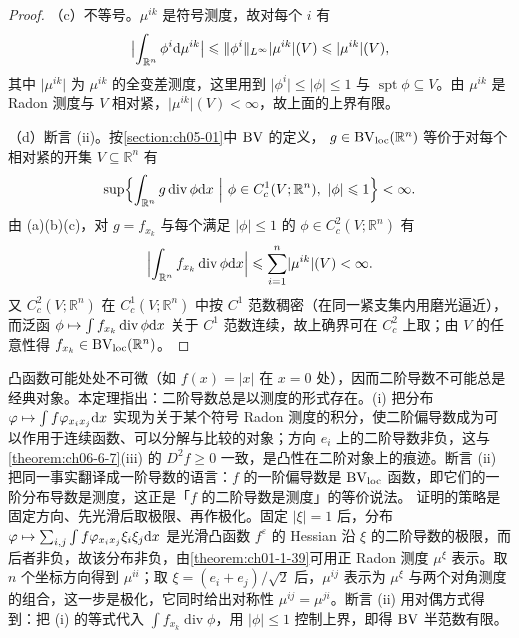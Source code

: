 \documentclass[../../main.tex]{subfiles}%
\begin{document}
\begin{proof}
（c）不等号。$\mu^{ik}$ 是符号测度，故对每个 $i$ 有
\begin{align*}
\bigl\lvert\int_{\mathbb{R}^n}\phi^{i}\mathrm{d}\mu^{ik}\bigr\rvert\leqslant\lVert\phi^{i}\rVert_{L^{\infty}}\lvert\mu^{ik}\rvert(V)\leqslant\lvert\mu^{ik}\rvert(V),
\end{align*}
其中 $\lvert\mu^{ik}\rvert$ 为 $\mu^{ik}$ 的全变差测度，这里用到 $\lvert\phi^{i}\rvert\leqslant\lvert\phi\rvert\leqslant1$ 与 $\operatorname{spt}\phi\subseteq V$。由 $\mu^{ik}$ 是 Radon 测度与 $V$ 相对紧，$\lvert\mu^{ik}\rvert(V)<\infty$，故上面的上界有限。

（d）断言 (ii)。按\cref{section:ch05-01}中 $\mathrm{BV}$ 的定义，%
$g\in\mathrm{BV}_{\mathrm{loc}}(\mathbb{R}^n)$ 等价于对每个相对紧的开集 $V\subseteq\mathbb{R}^n$ 有
\begin{align*}
\sup\Bigl\{\int_{\mathbb{R}^n}g\operatorname{div}\phi\diff x\ \Big|\ \phi\in C_c^{1}(V;\mathbb{R}^n),\ \lvert\phi\rvert\leqslant1\Bigr\}<\infty .
\end{align*}
由 (a)(b)(c)，对 $g=f_{x_k}$ 与每个满足 $\lvert\phi\rvert\leqslant1$ 的 $\phi\in C_c^{2}(V;\mathbb{R}^n)$ 有
\begin{align*}
\Bigl\lvert\int_{\mathbb{R}^n}f_{x_k}\operatorname{div}\phi\mathrm{d} x\Bigr\rvert\leqslant\sum_{i=1}^{n}\lvert\mu^{ik}\rvert(V)<\infty .
\end{align*}
又 $C_c^{2}(V;\mathbb{R}^n)$ 在 $C_c^{1}(V;\mathbb{R}^n)$ 中按 $C^{1}$ 范数稠密（在同一紧支集内用磨光逼近），而泛函 $\phi\mapsto\int f_{x_k}\operatorname{div}\phi\mathrm{d} x$ 关于 $C^{1}$ 范数连续，故上确界可在 $C_c^{2}$ 上取；由 $V$ 的任意性得 $f_{x_k}\in\mathrm{BV}_{\mathrm{loc}}(\mathbb{R}^n)$。%
\end{proof}

\begin{remark}\label{remark:ch06-thm-6-8-动机}
凸函数可能处处不可微（如 $f(x)=\lvert x\rvert$ 在 $x=0$ 处），因而二阶导数不可能总是经典对象。本定理指出：二阶导数总是以测度的形式存在。(i) 把分布 $\varphi\mapsto\int f\varphi_{x_ix_j}\mathrm{d} x$ 实现为关于某个符号 Radon 测度的积分，使二阶偏导数成为可以作用于连续函数、可以分解与比较的对象；方向 $e_i$ 上的二阶导数非负，这与\cref{theorem:ch06-6-7}(iii) 的 $D^{2}f\geqslant0$ 一致，是凸性在二阶对象上的痕迹。断言 (ii) 把同一事实翻译成一阶导数的语言：$f$ 的一阶偏导数是 $\mathrm{BV}_{\mathrm{loc}}$ 函数，即它们的一阶分布导数是测度，这正是「$f$ 的二阶导数是测度」的等价说法。%
证明的策略是固定方向、先光滑后取极限、再作极化。固定 $\lvert\xi\rvert=1$ 后，分布 $\varphi\mapsto\sum_{i,j}\int f\varphi_{x_ix_j}\xi_i\xi_j\mathrm{d} x$ 是光滑凸函数 $f^{\varepsilon}$ 的 Hessian 沿 $\xi$ 的二阶导数的极限，而后者非负，故该分布非负，由\cref{theorem:ch01-1-39}可用正 Radon 测度 $\mu^{\xi}$ 表示。取 $n$ 个坐标方向得到 $\mu^{ii}$；取 $\xi=(e_i+e_j)/\sqrt2$ 后，$\mu^{ij}$ 表示为 $\mu^{\xi}$ 与两个对角测度的组合，这一步是极化，它同时给出对称性 $\mu^{ij}=\mu^{ji}$。断言 (ii) 用对偶方式得到：把 (i) 的等式代入 $\int f_{x_k}\operatorname{div}\phi$，用 $\lvert\phi\rvert\leqslant1$ 控制上界，即得 $\mathrm{BV}$ 半范数有限。%
\end{remark}
\end{document}
